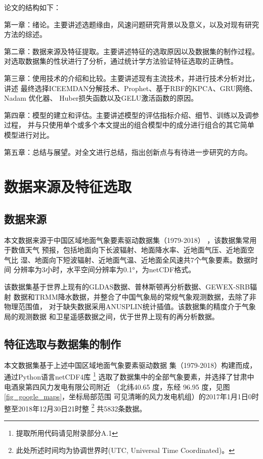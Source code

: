 \documentclass[AutoFakeBold]{LZUThesis}
\begin{document}
论文的结构如下：

第一章：绪论。主要讲述选题缘由，风速问题研究背景以及意义，以及对现有研究
方法的综述。

第二章：数据来源及特征提取。主要讲述特征的选取原因以及数据集的制作过程。
对选取数据集的性状进行了分析，通过统计学方法验证特征选取的正确性。

第三章：使用技术的介绍和比较。主要讲述现有主流技术，并进行技术分析对比，讲述
最终选择ICEEMDAN分解技术、Prophet、基于RBF的KPCA、GRU网络、Nadam 优化器、
Huber损失函数以及GELU激活函数的原因。

第四章：模型的建立和评估。主要讲述模型的评估指标介绍、细节、训练以及调参过程，
并与只使用单个或多个本文提出的组合模型中的成分进行组合的其它简单模型进行对比。

第五章：总结与展望。对全文进行总结，指出创新点与有待进一步研究的方向。




\chapter{数据来源及特征选取}
\section{数据来源}
本文数据来源于中国区域地面气象要素驱动数据集（1979-2018）
，该数据集常用于数值天气
预报，包括地面向下长波辐射、地面降水率、近地面气压、近地面空气比
湿、地面向下短波辐射、近地面气温、近地面全风速共7个气象要素。数据时间
分辨率为3小时，水平空间分辨率为0.1°，为netCDF格式。

该数据集基于世界上现有的GLDAS数据、普林斯顿再分析数据、GEWEX-SRB辐射
数据和TRMM降水数据，并整合了中国气象局的常规气象观测数据，去除了非物理范围值，
对于缺失数据采用ANUSPLIN统计插值。该数据集的精度介于气象局的观测数据
和卫星遥感数据之间，优于世界上现有的再分析数据。

\section{特征选取与数据集的制作}
本文数据集基于上述中国区域地面气象要素驱动数据
集（1979-2018）构建而成，通过Python语言netCDF4库
\footnote{提取所用代码请见附录部分A.1}
选取了数据集中的全部气象要素，并选择了甘肃中电酒泉第四风力发电有限公司附近
（北纬40.65 度，东经 96.95 度，见图\ref{fig_google_maps}，坐标局部范围
可见清晰的风力发电机组）的2017年1月1日0时整至2018年12月30日21时整
\footnote{此处所述时间均为协调世界时(UTC, Universal Time Coordinated)。}
共5832条数据。
\end{document}
